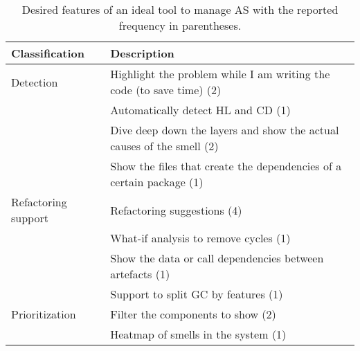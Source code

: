 \begin{table}[h]
    \centering
    \footnotesize
    \caption{Desired features of an ideal tool to manage AS with the reported frequency in parentheses.}
    \label{c2:tab:ideal-features}
    \begin{tabular}{@{}ll@{}}\toprule
    \textbf{Classification} & \textbf{Description} \\ \midrule
    Detection & Highlight the problem while I am writing the code (to save time) (2) \\
     & Automatically detect HL and CD (1) \\
     & Dive deep down the layers and show the actual causes of the smell (2) \\
     & Show the files that create the dependencies of a certain package (1) \\
    Refactoring support & Refactoring suggestions (4) \\
     & What-if analysis to remove cycles (1) \\
     & Show the data or call dependencies between artefacts (1) \\
     & Support to split GC by features (1) \\
    Prioritization & Filter the components to show (2) \\
     & Heatmap of smells in the system (1) \\ \bottomrule
    \end{tabular}
\end{table}